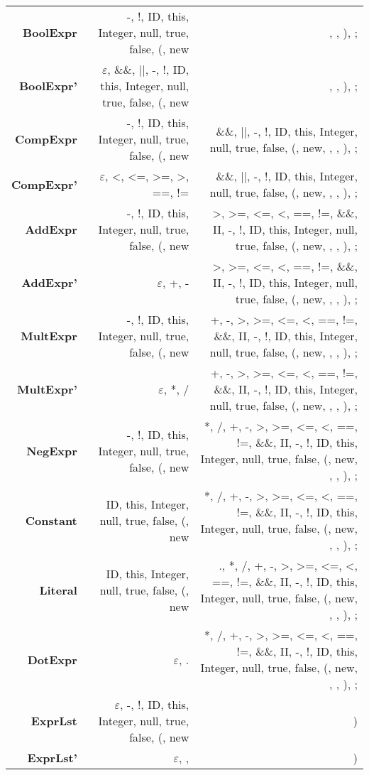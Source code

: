 \documentclass{report}
\begin{document}
\begin{tabularx}{\textwidth}{ r | R | R }
\textbf{BoolExpr} 
& -, !, ID, this, Integer, null, true, false, (, new 
& , , ), ; 
\\[1ex]

\textbf{BoolExpr'} 
& $\varepsilon$, \&\&, ||, -, !, ID, this, Integer, null, true, false, (, new 
& , , ), ; 
\\[1ex]

\textbf{CompExpr} 
& -, !, ID, this, Integer, null, true, false, (, new 
& \&\&, ||, -, !, ID, this, Integer, null, true, false, (, new, , , ), ; 
\\[1ex]

\textbf{CompExpr'} 
& $\varepsilon$, <, <=, >=, >, ==, !=
& \&\&, ||, -, !, ID, this, Integer, null, true, false, (, new, , , ), ; 
\\[1ex]

\textbf{AddExpr} 
& -, !, ID, this, Integer, null, true, false, (, new 
& >, >=, <=, <, ==, !=, \&\&, II, -, !, ID, this, Integer, null, true, false, (, new, , , ), ; 
\\[1ex]

\textbf{AddExpr'} 
& $\varepsilon$, +, -
& >, >=, <=, <, ==, !=, \&\&, II, -, !, ID, this, Integer, null, true, false, (, new, , , ), ; 
\\[1ex]

\textbf{MultExpr} 
& -, !, ID, this, Integer, null, true, false, (, new 
&  +, -, >, >=, <=, <, ==, !=, \&\&, II, -, !, ID, this, Integer, null, true, false, (, new, , , ), ; 
\\[1ex]

\textbf{MultExpr'} 
& $\varepsilon$, *, /
&  +, -, >, >=, <=, <, ==, !=, \&\&, II, -, !, ID, this, Integer, null, true, false, (, new, , , ), ;  
\\[1ex]

\textbf{NegExpr} 
&  -, !, ID, this, Integer, null, true, false, (, new 
&  *, /, +, -, >, >=, <=, <, ==, !=, \&\&, II, -, !, ID, this, Integer, null, true, false, (, new, , , ), ; 
\\[1ex]

\textbf{Constant}
& ID, this, Integer, null, true, false, (, new
&  *, /, +, -, >, >=, <=, <, ==, !=, \&\&, II, -, !, ID, this, Integer, null, true, false, (, new, , , ), ; 
\\[1ex]

\textbf{Literal}
& ID, this, Integer, null, true, false, (, new
& ., *, /, +, -, >, >=, <=, <, ==, !=, \&\&, II, -, !, ID, this, Integer, null, true, false, (, new, , , ), ; 
\\[1ex]

\textbf{DotExpr} 
& $\varepsilon$, .
&  *, /, +, -, >, >=, <=, <, ==, !=, \&\&, II, -, !, ID, this, Integer, null, true, false, (, new, , , ), ; 
\\[1ex]

\textbf{ExprLst}
& $\varepsilon$, -, !, ID, this, Integer, null, true, false, (, new
& )
\\[1ex]

\textbf{ExprLst'}
& $\varepsilon$, , 
& )
\\[1ex]

\hline


\end{tabularx}
\end{document}
